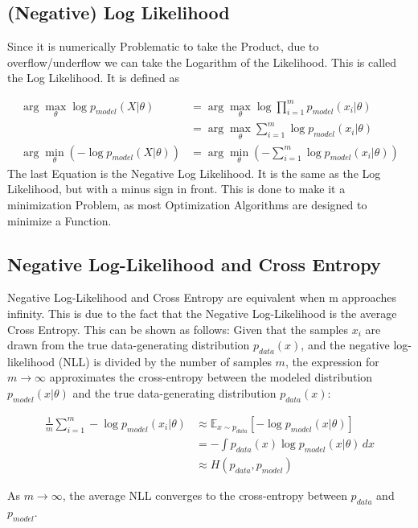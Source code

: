 \documentclass[a4paper]{article}
\begin{document}
\subsection{(Negative) Log Likelihood}

Since it is numerically Problematic to take the Product, due to overflow/underflow we can take the Logarithm of the Likelihood. This is called the Log Likelihood. It is defined as 

\begin{align*}
    \arg\max_{\theta} \log p_{model}(X|\theta) &= \arg\max_{\theta} \log \prod_{i = 1}^{m} p_{model}(x_{i}|\theta) \\
    &= \arg\max_{\theta} \sum_{i = 1}^{m} \log p_{model}(x_{i}|\theta) \\
    \arg\min_{\theta} \left(- \log p_{model}(X|\theta)\right) &= \arg\min_{\theta} \left(- \sum_{i = 1}^{m} \log p_{model}(x_{i}|\theta)\right)
\end{align*}
The last Equation is the Negative Log Likelihood. It is the same as the Log Likelihood, but with a minus sign in front. This is done to make it a minimization Problem, as most Optimization Algorithms are designed to minimize a Function.

\subsection{Negative Log-Likelihood and Cross Entropy}
Negative Log-Likelihood and Cross Entropy are equivalent when m approaches infinity. This is due to the fact that the Negative Log-Likelihood is the average Cross Entropy. This can be shown as follows:
Given that the samples \( x_i \) are drawn from the true data-generating distribution \( p_{data}(x) \), and the negative log-likelihood (NLL) is divided by the number of samples \( m \), the expression for \( m \to \infty \) approximates the cross-entropy between the modeled distribution \( p_{model}(x|\theta) \) and the true data-generating distribution \( p_{data}(x) \):

\begin{align*}
    \frac{1}{m} \sum_{i=1}^{m} - \log p_{model}(x_i|\theta) &\approx \mathbb{E}_{x \sim p_{data}}[-\log p_{model}(x|\theta)] \\
    &= -\int p_{data}(x) \log p_{model}(x|\theta) \, dx \\
    &\approx H(p_{data}, p_{model})
\end{align*}

As \( m \to \infty \), the average NLL converges to the cross-entropy between \( p_{data} \) and \( p_{model} \).
\end{document}
